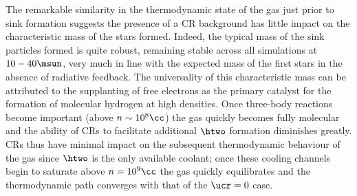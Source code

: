 The remarkable similarity in the thermodynamic state of the gas just prior to sink formation suggests the presence of a CR background has little impact on the characteristic mass of the stars formed.  
Indeed, the typical mass of the sink particles formed is quite robust, remaining stable across all simulations at $10-40\msun$, very much in line with the expected mass of the first stars in the absence of radiative feedback. 
The universality of this characteristic mass can be attributed to the supplanting of free electrons as the primary catalyst for the formation of molecular hydrogen at high densities.  
Once three-body reactions become important (above $n\sim10^8\cc$) the gas quickly becomes fully molecular and the ability of CRs to facilitate additional $\htwo$ formation diminishes greatly. 
CRs thus have minimal impact on the subsequent thermodynamic behaviour of the gas since $\htwo$ is the only available coolant; once these cooling channels begin to saturate above $n=10^9\cc$ the gas quickly equilibrates and the thermodynamic path converges with that of the $\ucr=0$ case.


